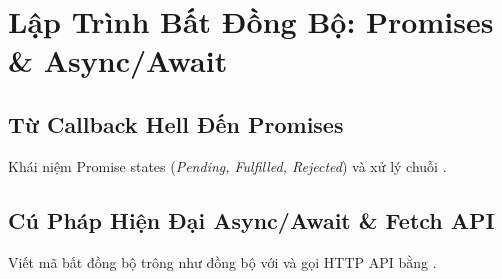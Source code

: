 \chapter{Lập Trình Bất Đồng Bộ: Promises \& Async/Await}
\label{chap:async_fetch}

\section{Từ Callback Hell Đến Promises}
Khái niệm Promise states (\textit{Pending, Fulfilled, Rejected}) và xử lý chuỗi .

\section{Cú Pháp Hiện Đại Async/Await \& Fetch API}
Viết mã bất đồng bộ trông như đồng bộ với  và gọi HTTP API bằng .
